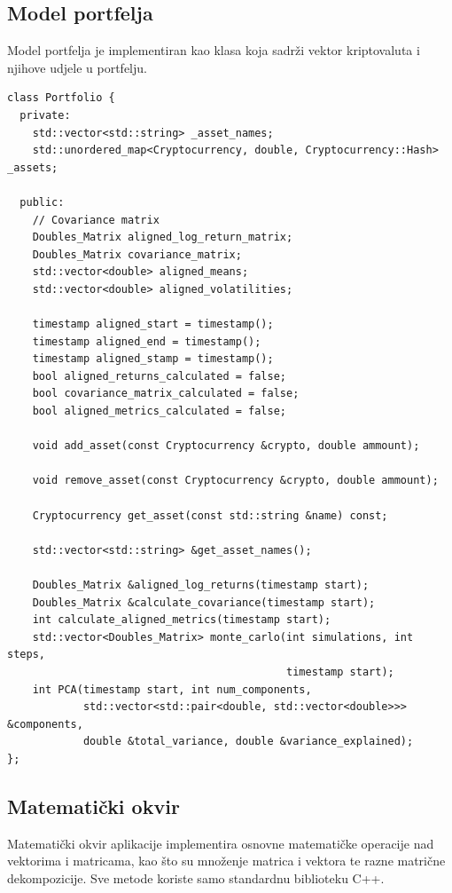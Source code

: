 \documentclass[zavrsnirad]{fer}
\begin{document}
\subsection{Model portfelja}
\label{sek:model_portfelja}
Model portfelja je implementiran kao klasa koja
sadrži vektor kriptovaluta i njihove udjele u portfelju.
\begin{lstlisting}[caption={Model portfelja}, label={lst:portfelj}]
class Portfolio {
  private:
    std::vector<std::string> _asset_names;
    std::unordered_map<Cryptocurrency, double, Cryptocurrency::Hash> _assets;

  public:
    // Covariance matrix
    Doubles_Matrix aligned_log_return_matrix;
    Doubles_Matrix covariance_matrix;
    std::vector<double> aligned_means;
    std::vector<double> aligned_volatilities;

    timestamp aligned_start = timestamp();
    timestamp aligned_end = timestamp();
    timestamp aligned_stamp = timestamp();
    bool aligned_returns_calculated = false;
    bool covariance_matrix_calculated = false;
    bool aligned_metrics_calculated = false;

    void add_asset(const Cryptocurrency &crypto, double ammount);

    void remove_asset(const Cryptocurrency &crypto, double ammount);

    Cryptocurrency get_asset(const std::string &name) const;

    std::vector<std::string> &get_asset_names();

    Doubles_Matrix &aligned_log_returns(timestamp start);
    Doubles_Matrix &calculate_covariance(timestamp start);
    int calculate_aligned_metrics(timestamp start);
    std::vector<Doubles_Matrix> monte_carlo(int simulations, int steps,
                                            timestamp start);
    int PCA(timestamp start, int num_components,
            std::vector<std::pair<double, std::vector<double>>> &components,
            double &total_variance, double &variance_explained);
};
\end{lstlisting}

\subsection{Matematički okvir}
\label{sek:matematicki_okvir}
Matematički okvir aplikacije implementira osnovne matematičke
operacije nad vektorima i matricama, kao što su množenje
matrica i vektora te razne matrične dekompozicije. Sve metode koriste
samo standardnu biblioteku C++.
\end{document}
